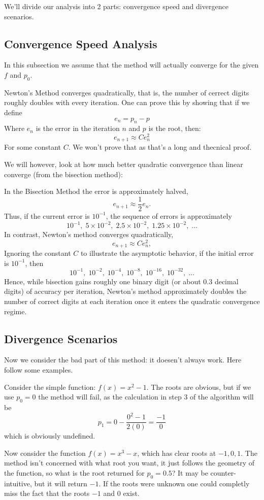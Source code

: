 \documentclass[12pt]{article}
\theoremstyle{remark}
\begin{document}
We'll divide our analysis into 2 parts: convergence speed and divergence scenarios.

\subsection{Convergence Speed Analysis}

In this subsection we assume that the method will actually converge for the given $f$ and $p_0$.

Newton's Method converges quadratically, that is, the number of cerrect digits roughly doubles with every iteration. One can prove this by showing that if we define
\[
  e_n = p_n - p
\]
Where $e_n$ is the error in the iteration $n$ and $p$ is the root, then:
\[
  e_{n + 1} \approx Ce^2_n
\]
For some constant $C$. We won't prove that as that's a long and thecnical proof.

We will however, look at how much better quadratic convergence than linear converge (from the bisection method):

In the Bisection Method the error is approximately halved,
\[
e_{n+1} \approx \frac{1}{2}e_n.
\]
Thus, if the current error is $10^{-1}$, the sequence of errors is approximately
\[
10^{-1},\; 5\times10^{-2},\; 2.5\times10^{-2},\; 1.25\times10^{-2},\; \ldots
\]
In contrast, Newton's method converges quadratically,
\[
e_{n+1} \approx Ce_n^2,
\]
Ignoring the constant $C$ to illustrate the asymptotic behavior, if the initial error is $10^{-1}$, then
\[
10^{-1},\; 10^{-2},\;10^{-4},\; 10^{-8},\;10^{-16},\; 10^{-32},\; \ldots
\]
Hence, while bisection gains roughly one binary digit (or about $0.3$ decimal digits) of accuracy per iteration, Newton's method approximately doubles the number of correct digits at each iteration once it enters the quadratic convergence regime.

\subsection{Divergence Scenarios}

Now we consider the bad part of this method: it doesen't always work. Here follow some examples.

Consider the simple function: $f(x) = x^2 - 1$. The roots are obvious, but if we use $p_0 = 0$ the method will fail, as the calculation in step 3 of the algorithm will be
\[
  p_1 = 0 - \frac{{0^2 - 1}}{2(0)} = \frac{-1}{0}
\]
which is obviously undefined.

Now consider the function $f(x) = x^3 - x$, which has clear roots at $-1, 0, 1$. The method isn't concerned with what root you want, it just follows the geometry of the function, so what is the root returned for $p_0 = 0.5$? It may be counter-intuitive, but it will return $-1$. If the roots were unknown one could completly miss the fact that the roots $-1$ and $0$ exist.
\end{document}
